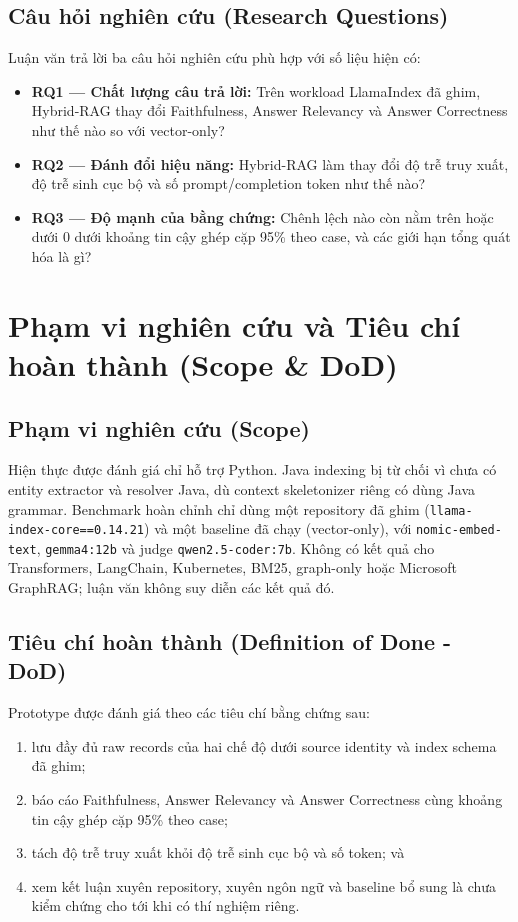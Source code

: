 \documentclass[12pt,a4paper,oneside]{report}
\begin{document}
\subsection{Câu hỏi nghiên cứu (Research Questions)}
Luận văn trả lời ba câu hỏi nghiên cứu phù hợp với số liệu hiện có:
\begin{itemize}
    \item \textbf{RQ1 --- Chất lượng câu trả lời:} Trên workload LlamaIndex đã ghim, Hybrid-RAG thay đổi Faithfulness, Answer Relevancy và Answer Correctness như thế nào so với vector-only?
    \item \textbf{RQ2 --- Đánh đổi hiệu năng:} Hybrid-RAG làm thay đổi độ trễ truy xuất, độ trễ sinh cục bộ và số prompt/completion token như thế nào?
    \item \textbf{RQ3 --- Độ mạnh của bằng chứng:} Chênh lệch nào còn nằm trên hoặc dưới 0 dưới khoảng tin cậy ghép cặp 95\% theo case, và các giới hạn tổng quát hóa là gì?
\end{itemize}

\section{Phạm vi nghiên cứu và Tiêu chí hoàn thành (Scope \& DoD)}
\subsection{Phạm vi nghiên cứu (Scope)}
Hiện thực được đánh giá chỉ hỗ trợ Python. Java indexing bị từ chối vì chưa có entity extractor và resolver Java, dù context skeletonizer riêng có dùng Java grammar. Benchmark hoàn chỉnh chỉ dùng một repository đã ghim (\texttt{llama-index-core==0.14.21}) và một baseline đã chạy (vector-only), với \texttt{nomic-embed-text}, \texttt{gemma4:12b} và judge \texttt{qwen2.5-coder:7b}. Không có kết quả cho Transformers, LangChain, Kubernetes, BM25, graph-only hoặc Microsoft GraphRAG; luận văn không suy diễn các kết quả đó.

\subsection{Tiêu chí hoàn thành (Definition of Done - DoD)}
Prototype được đánh giá theo các tiêu chí bằng chứng sau:
\begin{enumerate}
    \item lưu đầy đủ raw records của hai chế độ dưới source identity và index schema đã ghim;
    \item báo cáo Faithfulness, Answer Relevancy và Answer Correctness cùng khoảng tin cậy ghép cặp 95\% theo case;
    \item tách độ trễ truy xuất khỏi độ trễ sinh cục bộ và số token; và
    \item xem kết luận xuyên repository, xuyên ngôn ngữ và baseline bổ sung là chưa kiểm chứng cho tới khi có thí nghiệm riêng.
\end{enumerate}
\end{document}
